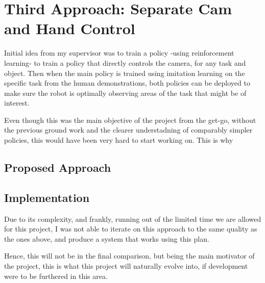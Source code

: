 \section{Third Approach: Separate Cam and Hand Control}
Initial idea from my supervisor was to train a policy -using reinforcement learning- to train a policy that directly controls the camera, for any task and object. Then when the main policy is trained using imitation learning on the specific task from the human demonstrations, both policies can be deployed to make sure the robot is optimally observing areas of the task that might be of interest.

Even though this was the main objective of the project from the get-go, without the previous ground work and the clearer understadning of comparably simpler policies, this would have been very hard to start working on. This is why 

\subsection{Proposed Approach}


\subsection{Implementation}
Due to its complexity, and frankly, running out of the limited time we are allowed for this project, I was not able to iterate on this approach to the same quality as the ones above, and produce a system that works using this plan.

Hence, this will not be in the final comparison, but being the main motivator of the project, this is what this project will naturally evolve into, if development were to be furthered in this area.

